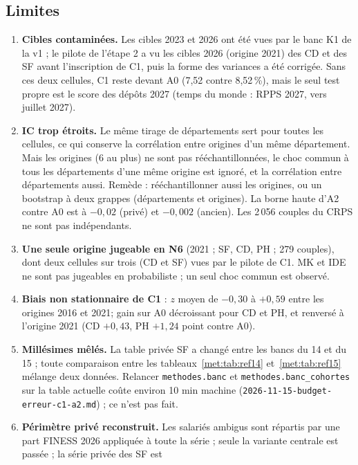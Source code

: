 \subsection{Limites}
\label{met:limites}
\begin{enumerate}
  \item \textbf{Cibles contaminées.} Les cibles 2023 et 2026 ont été vues par le banc K1 de la v1 ; le pilote
    de l'étape 2 a vu les cibles 2026 (origine 2021) des CD et des SF avant l'inscription de C1, puis la
    forme des variances a été corrigée. Sans ces deux cellules, C1 reste devant A0 (7,52 contre
    8,52\,\%\mesure), mais le seul test propre est le score des dépôts 2027 (temps du monde : RPPS 2027,
    vers juillet 2027\suppose).
  \item \textbf{IC trop étroits.} Le même tirage de départements sert pour toutes les cellules, ce qui
    conserve la corrélation entre origines d'un même département. Mais les origines (6 au plus) ne sont pas
    rééchantillonnées, le choc commun à tous les départements d'une même origine est ignoré, et la
    corrélation entre départements aussi\suppose. Remède : rééchantillonner aussi les origines, ou un
    bootstrap à deux grappes (départements et origines). La borne haute d'A2 contre A0 est à $-0{,}02$ (privé) et $-0{,}002$
    (ancien)\mesure. Les 2\,056 couples du CRPS ne sont pas indépendants.
  \item \textbf{Une seule origine jugeable en N6} (2021 ; SF, CD, PH ; 279 couples), dont deux cellules sur
    trois (CD et SF) vues par le pilote de C1. MK et IDE ne sont pas jugeables en probabiliste ; un seul choc
    commun est observé.
  \item \textbf{Biais non stationnaire de C1} : $z$ moyen de $-0{,}30$ à $+0{,}59$ entre les origines 2016 et
    2021\mesure ; gain sur A0 décroissant pour CD et PH, et renversé à l'origine 2021 (CD $+0{,}43$, PH
    $+1{,}24$\mesure{} point contre A0).
  \item \textbf{Millésimes mêlés.} La table privée SF a changé entre les bancs du 14 et du 15 ; toute
    comparaison entre les tableaux~\ref{met:tab:ref14} et~\ref{met:tab:ref15} mélange deux données. Relancer
    \texttt{methodes.banc} et \texttt{methodes.banc\_cohortes} sur la table actuelle coûte environ
    10\suppose{} min machine (\texttt{2026-11-15-budget-erreur-c1-a2.md}) ; ce n'est pas fait.
  \item \textbf{Périmètre privé reconstruit.} Les salariés ambigus sont répartis par une part FINESS 2026
    appliquée à toute la série ; seule la variante centrale est passée ; la série privée des SF est

\end{enumerate}
